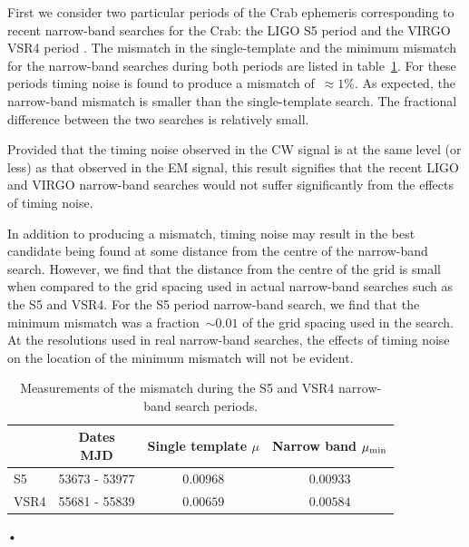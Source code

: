 \documentclass[../full_thesis/full_thesis.tex]{subfiles}
\begin{document}
First we consider two particular periods of the Crab ephemeris corresponding to
recent narrow-band searches for the Crab: the LIGO S5 period \citep{LIGO2008}
and the VIRGO VSR4 period \citep{LIGO2015}. The mismatch in the single-template
and the minimum mismatch for the narrow-band searches during both periods are
listed in table~\ref{tab: Results}. For these periods timing noise is
found to produce a mismatch of~$\approx 1\%$. As expected, the narrow-band
mismatch is smaller than the single-template search. The fractional difference
between the two searches is relatively small. 

Provided that the timing noise observed in the CW signal is at the same level
(or less) as that observed in the EM signal, this result signifies that the
recent LIGO and VIRGO narrow-band searches would not suffer significantly
from the effects of timing noise.

In addition to producing a mismatch, timing noise may result in the best
candidate being found at some distance from the centre of the narrow-band
search.  However, we find that the distance from the centre of the grid is
small when compared to the grid spacing used in actual narrow-band searches
such as the S5 and VSR4.  For the S5 period narrow-band search, we find that
the minimum mismatch was a fraction~$\sim 0.01$ of the grid spacing used in the
\citet{LIGO2008} search.  At the resolutions used in real narrow-band searches,
the effects of timing noise on the location of the minimum mismatch will not be
evident.

\begingroup
\small
\begin{table}[ht] 
\centering
\begin{tabular}{lccc} 
    & 
    \specialcell{Dates \\ MJD} & 
    \specialcell{Single  template \\ $\mu$} &
    \specialcell{Narrow band \\ $\mu_{\mathrm{min}}$} \\ \hline
S5 & 53673 - 53977 & $0.00968$ & $0.00933$ \\ 
VSR4 & 55681 - 55839 & $0.00659$ & $0.00584$ \\ 
\end{tabular}•
\caption{Measurements of the mismatch during the S5 and VSR4 narrow-band search
         periods.}
\label{tab: Results}
\end{table}
\endgroup
\end{document}
